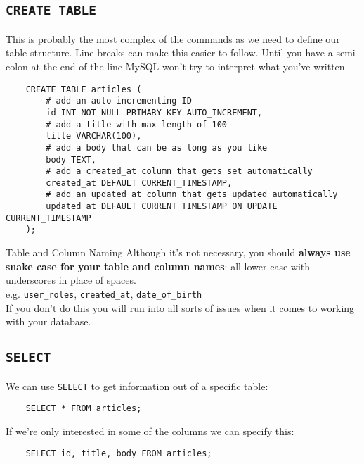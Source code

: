 \subsection{\texttt{CREATE TABLE}}

This is probably the most complex of the commands as we need to define our table structure. Line breaks can make this easier to follow. Until you have a semi-colon at the end of the line MySQL won't try to interpret what you've written.

\begin{verbatim}
    CREATE TABLE articles (
        # add an auto-incrementing ID
        id INT NOT NULL PRIMARY KEY AUTO_INCREMENT,
        # add a title with max length of 100
        title VARCHAR(100),
        # add a body that can be as long as you like
        body TEXT,
        # add a created_at column that gets set automatically
        created_at DEFAULT CURRENT_TIMESTAMP,
        # add an updated_at column that gets updated automatically
        updated_at DEFAULT CURRENT_TIMESTAMP ON UPDATE CURRENT_TIMESTAMP
    );
\end{verbatim}

\begin{infobox}{Table and Column Naming}
    Although it's not necessary, you should \textbf{always use snake case for your table and column names}: all lower-case with underscores in place of spaces.
    \\

    e.g. \texttt{user\_roles}, \texttt{created\_at}, \texttt{date\_of\_birth}
    \\

    If you don't do this you will run into all sorts of issues when it comes to working with your database.
\end{infobox}

\subsection{\texttt{SELECT}}

We can use \texttt{SELECT} to get information out of a specific table:

\begin{verbatim}
    SELECT * FROM articles;
\end{verbatim}

If we're only interested in some of the columns we can specify this:

\begin{verbatim}
    SELECT id, title, body FROM articles;
\end{verbatim}


